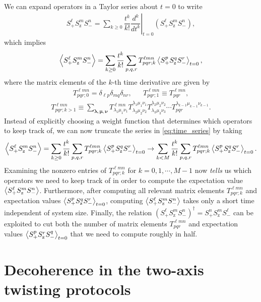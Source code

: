 \documentclass[aps,notitlepage,nofootinbib,11pt]{revtex4-1}
\newcommand{\f}[2]{\dfrac{#1}{#2}} %
\newcommand{\p}[1]{\left(#1\right)} %
\renewcommand{\v}{\bm} %
\newcommand{\bk}{\Braket} %
\newcommand{\z}{\text{z}}
\newcommand{\1}{\mathds{1}}
\begin{document}
We can expand operators in a Taylor series about $t=0$ to write
\begin{align}
  S_+^\ell S_\z^m S_-^n
  = \sum_{k\ge0} \f{t^k}{k!}
  \left.\f{d^k}{dt^k}\right|_{t=0} \p{S_+^\ell S_\z^m S_-^n},
\end{align}
which implies
\begin{align}
  \bk{S_+^\ell S_\z^m S_-^n}
  = \sum_{k\ge0} \f{t^k}{k!}
  \sum_{p,q,r} T^{\ell m n}_{pqr;k} \bk{S_+^p S_\z^q S_-^r}_{t=0},
  \label{eq:time_series}
\end{align}
where the matrix elements of the $k$-th time derivative are given by
\begin{align}
  T^{\ell m n}_{pqr;0}=\delta_{\ell p}\delta_{mq}\delta_{nr},
  &&
  T^{\ell m n}_{pqr;1}\equiv T^{\ell m n}_{pqr},
\end{align}
\begin{align}
  T^{\ell mn}_{pqr;k>1}
  \equiv \sum_{\v\lambda,\v\mu,\v\nu}
  T^{\ell mn}_{\lambda_1 \mu_1 \nu_1}
  T^{\lambda_1 \mu_1 \nu_1}_{\lambda_2 \mu_2 \nu_2}
  T^{\lambda_2 \mu_2 \nu_2}_{\lambda_3 \mu_3 \nu_3}
  \cdots T^{\lambda_{k-1} \mu_{k-1} \nu_{k-1}}_{pqr}.
\end{align}
Instead of explicitly choosing a weight function that determines which
operators to keep track of, we can now truncate the series in
\eqref{eq:time_series} by taking
\begin{align}
  \bk{S_+^\ell S_\z^m S_-^n}
  = \sum_{k\ge0} \f{t^k}{k!}
  \sum_{p,q,r} T^{\ell m n}_{pqr;k} \bk{S_+^p S_\z^q S_-^r}_{t=0}
  \to \sum_{k<M} \f{t^k}{k!}
  \sum_{p,q,r} T^{\ell m n}_{pqr;k} \bk{S_+^p S_\z^q S_-^r}_{t=0}.
\end{align}
Examining the nonzero entries of $T^{\ell mn}_{pqr;k}$ for
$k=0,1,\cdots,M-1$ now {\it tells} us which operators we need to keep
track of in order to compute the expectation value
$\bk{S_+^\ell S_\z^m S_-^n}$.  Furthermore, after computing all
relevant matrix elements $T^{\ell mn}_{pqr;k}$ and expectation values
$\bk{S_+^p S_\z^q S_-^r}_{t=0}$, computing
$\bk{S_+^\ell S_\z^m S_-^n}$ takes only a short time independent of
system size.  Finally, the relation
$\p{S_+^\ell S_\z^m S_-^n}^\dag=S_+^n S_\z^m S_-^\ell$ can be
exploited to cut both the number of matrix elements
$T^{\ell mn}_{pqr}$ and expectation values
$\bk{S_+^p S_\z^r S_-^q}_{t=0}$ that we need to compute roughly in
half.


\section{Decoherence in the two-axis twisting protocols}
\end{document}
